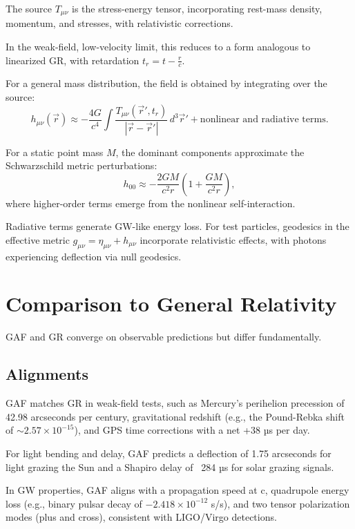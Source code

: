 \documentclass{article}
\begin{document}
The source \( T_{\mu\nu} \) is the stress-energy tensor, incorporating rest-mass density, momentum, and stresses, with relativistic corrections.

In the weak-field, low-velocity limit, this reduces to a form analogous to linearized GR, with retardation \( t_r = t - \frac{r}{c} \).

For a general mass distribution, the field is obtained by integrating over the source:
\begin{equation}
h_{\mu\nu}(\vec{r}) \approx -\frac{4G}{c^4} \int \frac{T_{\mu\nu}(\vec{r}', t_r)}{|\vec{r} - \vec{r}'|} \, d^3 \vec{r}' + \text{nonlinear and radiative terms}.
\end{equation}

For a static point mass \( M \), the dominant components approximate the Schwarzschild metric perturbations:
\begin{equation}
h_{00} \approx -\frac{2 G M}{c^2 r} \left( 1 + \frac{G M}{c^2 r} \right),
\end{equation}
where higher-order terms emerge from the nonlinear self-interaction.

Radiative terms generate GW-like energy loss. For test particles, geodesics in the effective metric \( g_{\mu\nu} = \eta_{\mu\nu} + h_{\mu\nu} \) incorporate relativistic effects, with photons experiencing deflection via null geodesics.

\section{Comparison to General Relativity}

GAF and GR converge on observable predictions but differ fundamentally.

\subsection{Alignments}

GAF matches GR in weak-field tests, such as Mercury's perihelion precession of 42.98 arcseconds per century, gravitational redshift (e.g., the Pound-Rebka shift of \( \sim 2.57 \times 10^{-15} \)), and GPS time corrections with a net +38 µs per day.

For light bending and delay, GAF predicts a deflection of 1.75 arcseconds for light grazing the Sun and a Shapiro delay of ~284 µs for solar grazing signals.

In GW properties, GAF aligns with a propagation speed at c, quadrupole energy loss (e.g., binary pulsar decay of \( -2.418 \times 10^{-12} \) s/s), and two tensor polarization modes (plus and cross), consistent with LIGO/Virgo detections.
\end{document}
